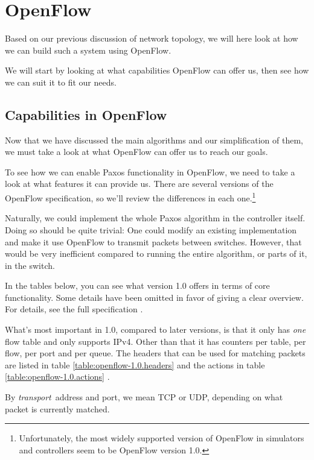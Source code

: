 \clearpage
\section{OpenFlow}
\label{chapter:openflow.design}

Based on our previous discussion of network topology, we will here look at
how we can build such a system using OpenFlow.

We will start by looking at what capabilities OpenFlow can offer us, then
see how we can suit it to fit our needs.

\subsection{Capabilities in OpenFlow}
\label{chapter:details.openflow}

Now that we have discussed the main algorithms and our simplification of
them, we must take a look at what OpenFlow can offer us to reach our goals.

To see how we can enable Paxos functionality in OpenFlow, we need to take a
look at what features it can provide us.  There are several versions of the
OpenFlow specification, so we'll review the differences in each
one.\footnote{Unfortunately, the most widely supported version of OpenFlow in
simulators and controllers seem to be OpenFlow version 1.0.}

Naturally, we could implement the whole Paxos algorithm in the controller
itself.  Doing so should be quite trivial: One could modify an existing
implementation and make it use OpenFlow to transmit packets between
switches.  However, that would be very inefficient compared to running the
entire algorithm, or parts of it, in the switch.

In the tables below, you can see what version 1.0 offers in terms of core
functionality.  Some details have been omitted in favor of giving a clear
overview.  For details, see the full specification \cite{openflow-1.0}.

What's most important in 1.0, compared to later versions, is that it only
has \textit{one} flow table and only supports IPv4.  Other than that it has
counters per table, per flow, per port and per queue.  The headers that can
be used for matching packets are listed in table
\ref{table:openflow-1.0.headers}  and
the actions in table \ref{table:openflow-1.0.actions}
.

By \textit{transport} address and port, we mean \ac{TCP} or \ac{UDP},
depending on what packet is currently matched.

